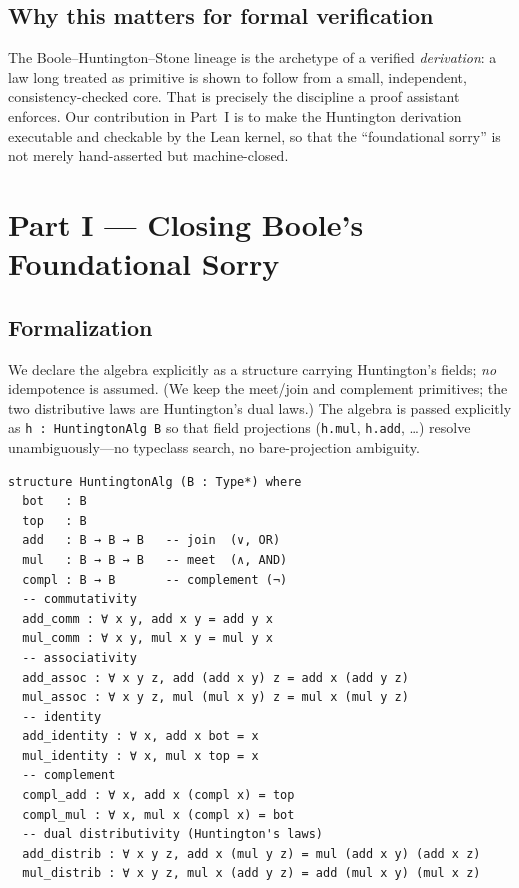 \documentclass[11pt]{article}
\theoremstyle{definition}
\begin{document}
\subsection{Why this matters for formal verification}

The Boole--Huntington--Stone lineage is the archetype of a verified
\emph{derivation}: a law long treated as primitive is shown to follow from a
small, independent, consistency-checked core. That is precisely the discipline
a proof assistant enforces. Our contribution in Part~I is to make the
Huntington derivation executable and checkable by the Lean kernel, so that the
``foundational sorry'' is not merely hand-asserted but machine-closed.

\section{Part I --- Closing Boole's Foundational Sorry}
\label{sec:boole}

\subsection{Formalization}
\label{sec:boole-formal}

We declare the algebra explicitly as a structure carrying Huntington's fields;
\emph{no} idempotence is assumed. (We keep the meet/join and complement
primitives; the two distributive laws are Huntington's dual laws.) The algebra
is passed explicitly as \texttt{h : HuntingtonAlg B} so that field projections
(\texttt{h.mul}, \texttt{h.add}, \ldots) resolve unambiguously---no typeclass
search, no bare-projection ambiguity.

\begin{lstlisting}[language=leanL,caption={The \texttt{HuntingtonAlg} structure
  (Boole\_Idempotency.lean).}]
structure HuntingtonAlg (B : Type*) where
  bot   : B
  top   : B
  add   : B → B → B   -- join  (∨, OR)
  mul   : B → B → B   -- meet  (∧, AND)
  compl : B → B       -- complement (¬)
  -- commutativity
  add_comm : ∀ x y, add x y = add y x
  mul_comm : ∀ x y, mul x y = mul y x
  -- associativity
  add_assoc : ∀ x y z, add (add x y) z = add x (add y z)
  mul_assoc : ∀ x y z, mul (mul x y) z = mul x (mul y z)
  -- identity
  add_identity : ∀ x, add x bot = x
  mul_identity : ∀ x, mul x top = x
  -- complement
  compl_add : ∀ x, add x (compl x) = top
  compl_mul : ∀ x, mul x (compl x) = bot
  -- dual distributivity (Huntington's laws)
  add_distrib : ∀ x y z, add x (mul y z) = mul (add x y) (add x z)
  mul_distrib : ∀ x y z, mul x (add y z) = add (mul x y) (mul x z)
\end{lstlisting}
\end{document}
